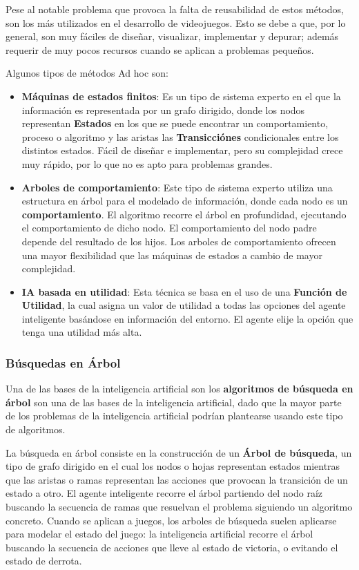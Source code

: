 Pese al notable problema que provoca la falta de reusabilidad de estos métodos, son los más utilizados en el desarrollo de videojuegos. Esto se debe a que, por lo general, son muy fáciles de diseñar, visualizar, implementar y depurar; además requerir de muy pocos recursos cuando se aplican a problemas pequeños.

Algunos tipos de métodos Ad hoc son:
\begin{itemize}
\item \textbf{Máquinas de estados finitos}: Es un tipo de sistema experto en el que la información es representada por un grafo dirigido, donde los nodos representan \textbf{Estados} en los que se puede encontrar un comportamiento, proceso o algoritmo y las aristas  las \textbf{Transicciónes} condicionales entre los distintos estados. Fácil de diseñar e implementar, pero su complejidad crece muy rápido, por lo que no es apto para problemas grandes.
\item \textbf{Arboles de comportamiento}: Este tipo de sistema experto utiliza una estructura en árbol para el modelado de información, donde cada nodo es un \textbf{comportamiento}. El algoritmo recorre el árbol en profundidad, ejecutando el comportamiento de dicho nodo. El comportamiento del nodo padre depende del resultado de los hijos. Los arboles de comportamiento ofrecen una mayor flexibilidad que las máquinas de estados a cambio de mayor complejidad.
\item \textbf{IA basada en utilidad}: Esta técnica se basa en el uso de una \textbf{Función de Utilidad}, la cual asigna un valor de utilidad a todas las opciones del agente inteligente basándose en información del entorno. El agente elije la opción que tenga una utilidad más alta.
\end{itemize} 

\subsubsection{Búsquedas en Árbol}
Una de las bases de la inteligencia artificial son los \textbf{algoritmos de búsqueda en árbol} son una de las bases de la inteligencia artificial, dado que la mayor parte de los problemas de la inteligencia artificial podrían plantearse usando este tipo de algoritmos\cite{ai_and_games}.

La búsqueda en árbol consiste en la construcción de un \textbf{Árbol de búsqueda}, un tipo de grafo dirigido en el cual los nodos o hojas representan estados mientras que las aristas o ramas representan las acciones que provocan la transición de un estado a otro. El agente inteligente recorre el árbol partiendo del nodo raíz buscando la secuencia de ramas que resuelvan el problema siguiendo un algoritmo concreto. Cuando se aplican a juegos, los arboles de búsqueda suelen aplicarse para modelar el estado del juego: la inteligencia artificial recorre el árbol buscando la secuencia de acciones que lleve al estado de victoria, o evitando el estado de derrota.

